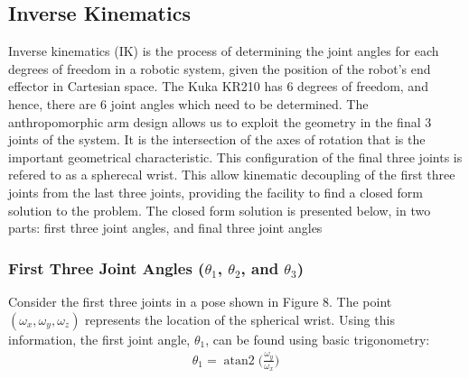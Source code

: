 \documentclass[a4paper]{article}
\DeclareMathOperator{\atantwo}{atan2}
\begin{document}
\newpage

\subsection{Inverse Kinematics}
Inverse kinematics (IK) is the process of determining the joint angles for each degrees of freedom in a robotic system, given the position of the robot's end effector in Cartesian space. The Kuka KR210 has 6 degrees of freedom, and hence, there are 6 joint angles which need to be determined. The anthropomorphic arm design allows us to exploit the geometry in the final 3 joints of the system. It is the intersection of the axes of rotation that is the important geometrical characteristic. This configuration of the final three joints is refered to as a spherecal wrist. This allow kinematic decoupling of the first three joints from the last three joints, providing the facility to find a closed form solution to the problem. The closed form solution is presented below, in two parts: first three joint angles, and final three joint angles

\subsubsection{First Three Joint Angles ($\theta_1$, $\theta_2$, and $\theta_3$)}
Consider the first three joints in a pose shown in Figure 8. The point $(\omega_x, \omega_y, \omega_z)$ represents the location of the spherical wrist. Using this information, the first joint angle, $\theta_1$, can be found using basic trigonometry:
\begin{align}
\theta_1 = \atantwo \bigg( \frac{\omega_y}{\omega_x} \bigg)
\end{align}
\end{document}
